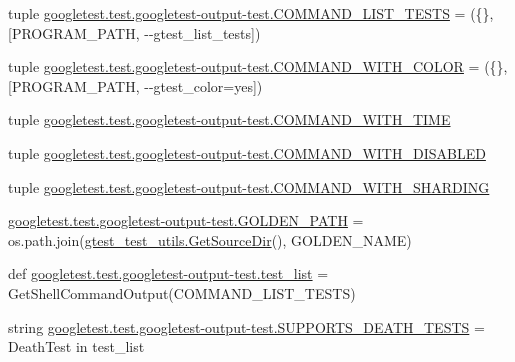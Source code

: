 \begin{DoxyCompactItemize}
tuple \mbox{\hyperlink{namespacegoogletest_1_1test_1_1googletest-output-test_a7f03431207f9588f4a02b7578186ef11}{googletest.\+test.\+googletest-\/output-\/test.\+C\+O\+M\+M\+A\+N\+D\+\_\+\+L\+I\+S\+T\+\_\+\+T\+E\+S\+TS}} = (\{\}, \mbox{[}P\+R\+O\+G\+R\+A\+M\+\_\+\+P\+A\+TH, \textquotesingle{}-\/-\/gtest\+\_\+list\+\_\+tests\textquotesingle{}\mbox{]})
\item 
tuple \mbox{\hyperlink{namespacegoogletest_1_1test_1_1googletest-output-test_ae8702b1a4f6d9b35ae7360c1b9099f98}{googletest.\+test.\+googletest-\/output-\/test.\+C\+O\+M\+M\+A\+N\+D\+\_\+\+W\+I\+T\+H\+\_\+\+C\+O\+L\+OR}} = (\{\}, \mbox{[}P\+R\+O\+G\+R\+A\+M\+\_\+\+P\+A\+TH, \textquotesingle{}-\/-\/gtest\+\_\+color=yes\textquotesingle{}\mbox{]})
\item 
tuple \mbox{\hyperlink{namespacegoogletest_1_1test_1_1googletest-output-test_a54e72934e08e180b2529b4940fa50e04}{googletest.\+test.\+googletest-\/output-\/test.\+C\+O\+M\+M\+A\+N\+D\+\_\+\+W\+I\+T\+H\+\_\+\+T\+I\+ME}}
\item 
tuple \mbox{\hyperlink{namespacegoogletest_1_1test_1_1googletest-output-test_a8a41b9a813e853542f000ad1c00a269a}{googletest.\+test.\+googletest-\/output-\/test.\+C\+O\+M\+M\+A\+N\+D\+\_\+\+W\+I\+T\+H\+\_\+\+D\+I\+S\+A\+B\+L\+ED}}
\item 
tuple \mbox{\hyperlink{namespacegoogletest_1_1test_1_1googletest-output-test_a852e37f51b0c4f3ce83c1d84eeaf5b1e}{googletest.\+test.\+googletest-\/output-\/test.\+C\+O\+M\+M\+A\+N\+D\+\_\+\+W\+I\+T\+H\+\_\+\+S\+H\+A\+R\+D\+I\+NG}}
\item 
\mbox{\hyperlink{namespacegoogletest_1_1test_1_1googletest-output-test_a8aa8d805d7dfff2638f6faeb8a25cd43}{googletest.\+test.\+googletest-\/output-\/test.\+G\+O\+L\+D\+E\+N\+\_\+\+P\+A\+TH}} = os.\+path.\+join(\mbox{\hyperlink{namespacegtest__test__utils_aaff66cb0980804d8bd57dc719d4b5518}{gtest\+\_\+test\+\_\+utils.\+Get\+Source\+Dir}}(), G\+O\+L\+D\+E\+N\+\_\+\+N\+A\+ME)
\item 
def \mbox{\hyperlink{namespacegoogletest_1_1test_1_1googletest-output-test_a444fd372288937a5fb698098ef061576}{googletest.\+test.\+googletest-\/output-\/test.\+test\+\_\+list}} = Get\+Shell\+Command\+Output(C\+O\+M\+M\+A\+N\+D\+\_\+\+L\+I\+S\+T\+\_\+\+T\+E\+S\+TS)
\item 
string \mbox{\hyperlink{namespacegoogletest_1_1test_1_1googletest-output-test_a165fb716a211e78dec29ad1ebbbc5894}{googletest.\+test.\+googletest-\/output-\/test.\+S\+U\+P\+P\+O\+R\+T\+S\+\_\+\+D\+E\+A\+T\+H\+\_\+\+T\+E\+S\+TS}} = \textquotesingle{}Death\+Test\textquotesingle{} in test\+\_\+list

\end{DoxyCompactItemize}
